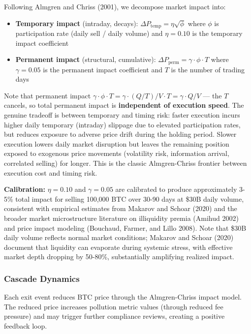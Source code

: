 \documentclass[
  11pt,
]{article}
\providecommand{\tightlist}{%
  \setlength{\itemsep}{0pt}\setlength{\parskip}{0pt}}\usepackage{longtable,booktabs,array}
\begin{document}
Following Almgren and Chriss (2001), we decompose market impact into:

\begin{itemize}
\tightlist
\item
  \textbf{Temporary impact} (intraday, decays):
  \(\Delta P_{\text{temp}} = \eta \sqrt{\phi}\) where \(\phi\) is
  participation rate (daily sell / daily volume) and \(\eta = 0.10\) is
  the temporary impact coefficient
\item
  \textbf{Permanent impact} (structural, cumulative):
  \(\Delta P_{\text{perm}} = \gamma \cdot \phi \cdot T\) where
  \(\gamma = 0.05\) is the permanent impact coefficient and \(T\) is the
  number of trading days
\end{itemize}

Note that permanent impact
\(\gamma \cdot \phi \cdot T = \gamma \cdot (Q/T) / V \cdot T = \gamma \cdot Q / V\)
--- the \(T\) cancels, so total permanent impact is \textbf{independent
of execution speed}. The genuine tradeoff is between temporary and
timing risk: faster execution incurs higher daily temporary (intraday)
slippage due to elevated participation rates, but reduces exposure to
adverse price drift during the holding period. Slower execution lowers
daily market disruption but leaves the remaining position exposed to
exogenous price movements (volatility risk, information arrival,
correlated selling) for longer. This is the classic Almgren-Chriss
frontier between execution cost and timing risk.

\textbf{Calibration:} \(\eta = 0.10\) and \(\gamma = 0.05\) are
calibrated to produce approximately 3-5\% total impact for selling
100,000 BTC over 30-90 days at \$30B daily volume, consistent with
empirical estimates from Makarov and Schoar (2020) and the broader
market microstructure literature on illiquidity premia (Amihud 2002) and
price impact modeling (Bouchaud, Farmer, and Lillo 2008). Note that
\$30B daily volume reflects normal market conditions; Makarov and Schoar
(2020) document that liquidity can evaporate during systemic stress,
with effective market depth dropping by 50-80\%, substantially
amplifying realized impact.

\hypertarget{cascade-dynamics}{%
\subsubsection{Cascade Dynamics}\label{cascade-dynamics}}

Each exit event reduces BTC price through the Almgren-Chriss impact
model. The reduced price increases pollution metric values (through
reduced fee pressure) and may trigger further compliance reviews,
creating a positive feedback loop.
\end{document}
